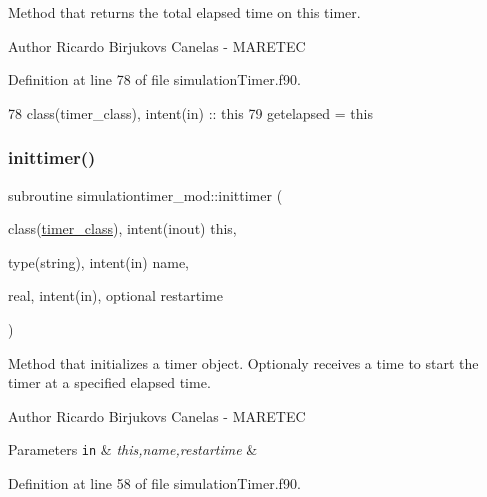 Method that returns the total elapsed time on this timer. 

\begin{DoxyAuthor}{Author}
Ricardo Birjukovs Canelas -\/ M\+A\+R\+E\+T\+EC 
\end{DoxyAuthor}


Definition at line 78 of file simulation\+Timer.\+f90.


\begin{DoxyCode}
78     \textcolor{keywordtype}{class}(timer\_class), \textcolor{keywordtype}{intent(in)} :: this
79     getelapsed = this%
\end{DoxyCode}
\mbox{\label{namespacesimulationtimer__mod_a3e4c0de31b2db7da6c0c781c047a3743}} 
\subsubsection{\texorpdfstring{inittimer()}{inittimer()}}
{\footnotesize\ttfamily subroutine simulationtimer\+\_\+mod\+::inittimer (\begin{DoxyParamCaption}\item[{class(\mbox{\hyperlink{structsimulationtimer__mod_1_1timer__class}{timer\+\_\+class}}), intent(inout)}]{this,  }\item[{type(string), intent(in)}]{name,  }\item[{real, intent(in), optional}]{restartime }\end{DoxyParamCaption})\hspace{0.3cm}{\ttfamily [private]}}



Method that initializes a timer object. Optionaly receives a time to start the timer at a specified elapsed time. 

\begin{DoxyAuthor}{Author}
Ricardo Birjukovs Canelas -\/ M\+A\+R\+E\+T\+EC 
\end{DoxyAuthor}

\begin{DoxyParams}[1]{Parameters}
\mbox{\tt in}  & {\em this,name,restartime} & \\
\hline
\end{DoxyParams}


Definition at line 58 of file simulation\+Timer.\+f90.


